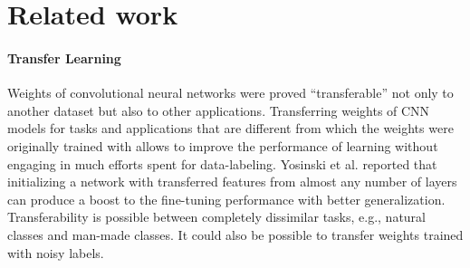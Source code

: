 \section{Related work}
\label{sec:related}

%



\paragraph{Transfer Learning}


Weights of convolutional neural networks were proved ``transferable'' not only to another dataset\cite{shin2016deep,yosinski2014transferable} but also to other applications\cite{girshick2014rich,long2015fully}.
Transferring weights of CNN models for tasks and applications that are different from which the weights were originally trained with allows to improve the performance of learning without engaging in much efforts spent for data-labeling.\cite{pan2010survey}
Yosinski et al.\cite{yosinski2014transferable} reported that initializing a network with transferred features from almost any number of layers can produce a boost to the fine-tuning performance with better generalization.
Transferability is possible between completely dissimilar tasks, e.g., natural classes and man-made classes.
It could also be possible to transfer weights trained with noisy labels.

